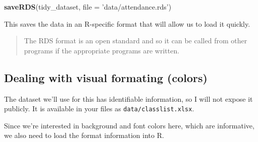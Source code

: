 \documentclass[12pt,letterpaperpaper,openany]{book}
\newenvironment{Shaded}{\begin{snugshade}}{\end{snugshade}}
\newcommand{\DataTypeTok}[1]{\textcolor[rgb]{0.13,0.29,0.53}{#1}}
\newcommand{\KeywordTok}[1]{\textcolor[rgb]{0.13,0.29,0.53}{\textbf{#1}}}
\newcommand{\NormalTok}[1]{#1}
\newcommand{\OperatorTok}[1]{\textcolor[rgb]{0.81,0.36,0.00}{\textbf{#1}}}
\newcommand{\StringTok}[1]{\textcolor[rgb]{0.31,0.60,0.02}{#1}}
\begin{document}
\begin{Shaded}
\begin{Highlighting}[]
\KeywordTok{saveRDS}\NormalTok{(tidy_dataset, }\DataTypeTok{file =} \StringTok{'data/attendance.rds'}\NormalTok{)}
\end{Highlighting}
\end{Shaded}

This saves the data in an R-specific format that will allow us to load it quickly.

\begin{quote}
The RDS format is an open standard and so it can be called from other programs if the
appropriate programs are written.
\end{quote}

\hypertarget{dealing-with-visual-formating-colors}{%
\subsection*{Dealing with visual formating (colors)}\label{dealing-with-visual-formating-colors}}

The dataset we'll use for this has identifiable information, so I will not expose
it publicly. It is available in your files as \texttt{data/classlist.xlsx}.

Since we're interested in background and font colors here, which are informative,
we also need to load the format information into R.

\begin{Shaded}
\end{Shaded}
\end{document}
